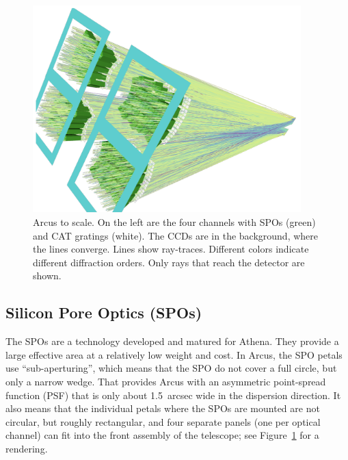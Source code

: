 \documentclass[12pt]{spieman}  %
\begin{document}
\begin{spacing}{2}
\begin{figure}
    \centering
    \includegraphics[height=8cm]{Arcus.png}
    \caption {\label{fig:arcus}
    Arcus to scale. On the left are the four channels with SPOs (green) and CAT gratings (white). The CCDs are in the background, where the lines converge. Lines show ray-traces. Different colors indicate different diffraction orders. Only rays that reach the detector are shown.
}
\end{figure}

\subsection{Silicon Pore Optics (SPOs)}
The SPOs are a technology developed and matured for Athena. They provide a large effective area at a relatively low weight and cost\cite{10.1117/12.2188988,10.1117/12.2599339,10.1117/12.2677388}. In Arcus, the SPO petals use ``sub-aperturing'', which means that the SPO do not cover a full circle, but only a narrow wedge. That provides Arcus with an asymmetric point-spread function (PSF) that is only about 1.5\ arcsec wide in the dispersion direction. It also means that the individual petals where the SPOs are mounted are not circular, but roughly rectangular, and four separate panels (one per optical channel) can fit into the front assembly of the telescope; see Figure~\ref{fig:arcus} for a rendering.


\end{spacing}
\end{document}
